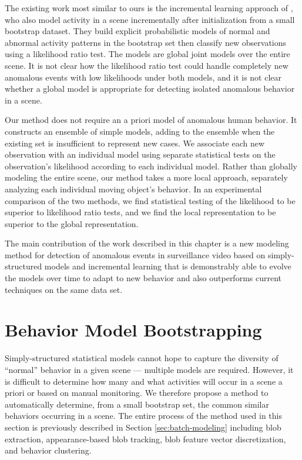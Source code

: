 The existing work most similar to ours is the incremental learning
approach of , who also model activity
in a scene incrementally after initialization from a small bootstrap
dataset. They build explicit probabilistic models of normal and
abnormal activity patterns in the bootstrap set then classify new
observations using a likelihood ratio test.  The models are global
joint models over the entire scene.  It is not clear how the
likelihood ratio test could handle completely new anomalous events
with low likelihoods under both models, and it is not clear whether a
global model is appropriate for detecting isolated anomalous behavior
in a scene.

Our method does not require an a priori model of anomalous human
behavior. It constructs an ensemble of simple models, adding to the
ensemble when the existing set is insufficient to represent new
cases. We associate each new observation with an individual model
using separate statistical tests on the observation's likelihood
according to each individual model.  Rather than globally modeling the
entire scene, our method takes a more local approach, separately
analyzing each individual moving object's behavior.  In an
experimental comparison of the two methods, we find statistical
testing of the likelihood to be superior to likelihood ratio tests,
and we find the local representation to be superior to the global
representation.


The main contribution of the work described in this chapter is a new
modeling method for detection of anomalous events in surveillance
video based on simply-structured models and incremental learning that
is demonstrably able to evolve the models over time to adapt to new
behavior and also outperforms current techniques on the same data set.

\section{Behavior Model Bootstrapping}
\label{sec:incremental-bootstrap}

Simply-structured statistical models cannot hope to capture the
diversity of ``normal'' behavior in a given scene --- multiple models
are required.  However, it is difficult to determine how many and what
activities will occur in a scene a priori or based on manual
monitoring.  We therefore propose a method to automatically determine,
from a small bootstrap set, the common similar behaviors occurring in
a scene. The entire process of the method used in this section is
previously described in Section \ref{sec:batch-modeling} including
blob extraction, appearance-based blob tracking, blob feature vector
discretization, and behavior clustering.

